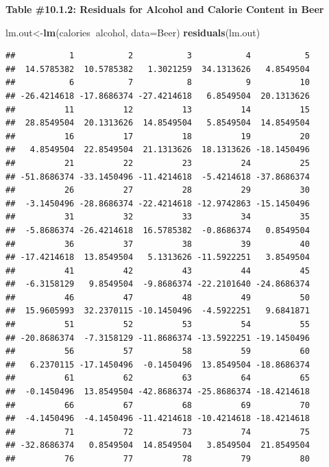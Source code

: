 \documentclass[
]{book}
\newenvironment{Shaded}{\begin{snugshade}}{\end{snugshade}}
\newcommand{\DataTypeTok}[1]{\textcolor[rgb]{0.13,0.29,0.53}{#1}}
\newcommand{\KeywordTok}[1]{\textcolor[rgb]{0.13,0.29,0.53}{\textbf{#1}}}
\newcommand{\NormalTok}[1]{#1}
\newcommand{\OperatorTok}[1]{\textcolor[rgb]{0.81,0.36,0.00}{\textbf{#1}}}
\begin{document}
\textbf{Table \#10.1.2: Residuals for Alcohol and Calorie Content in Beer}

\begin{Shaded}
\begin{Highlighting}[]
\NormalTok{lm.out<-}\KeywordTok{lm}\NormalTok{(calories}\OperatorTok{~}\NormalTok{alcohol, }\DataTypeTok{data=}\NormalTok{Beer) }
\KeywordTok{residuals}\NormalTok{(lm.out) }
\end{Highlighting}
\end{Shaded}

\begin{verbatim}
##           1           2           3           4           5 
##  14.5785382  10.5785382   1.3021259  34.1313626   4.8549504 
##           6           7           8           9          10 
## -26.4214618 -17.8686374 -27.4214618   6.8549504  20.1313626 
##          11          12          13          14          15 
##  28.8549504  20.1313626  14.8549504   5.8549504  14.8549504 
##          16          17          18          19          20 
##   4.8549504  22.8549504  21.1313626  18.1313626 -18.1450496 
##          21          22          23          24          25 
## -51.8686374 -33.1450496 -11.4214618  -5.4214618 -37.8686374 
##          26          27          28          29          30 
##  -3.1450496 -28.8686374 -22.4214618 -12.9742863 -15.1450496 
##          31          32          33          34          35 
##  -5.8686374 -26.4214618  16.5785382  -0.8686374   0.8549504 
##          36          37          38          39          40 
## -17.4214618  13.8549504   5.1313626 -11.5922251   3.8549504 
##          41          42          43          44          45 
##  -6.3158129   9.8549504  -9.8686374 -22.2101640 -24.8686374 
##          46          47          48          49          50 
##  15.9605993  32.2370115 -10.1450496  -4.5922251   9.6841871 
##          51          52          53          54          55 
## -20.8686374  -7.3158129 -11.8686374 -13.5922251 -19.1450496 
##          56          57          58          59          60 
##   6.2370115 -17.1450496  -0.1450496  13.8549504 -18.8686374 
##          61          62          63          64          65 
##  -0.1450496  13.8549504 -42.8686374 -25.8686374 -18.4214618 
##          66          67          68          69          70 
##  -4.1450496  -4.1450496 -11.4214618 -10.4214618 -18.4214618 
##          71          72          73          74          75 
## -32.8686374   0.8549504  14.8549504   3.8549504  21.8549504 
##          76          77          78          79          80 

\end{verbatim}
\end{document}

